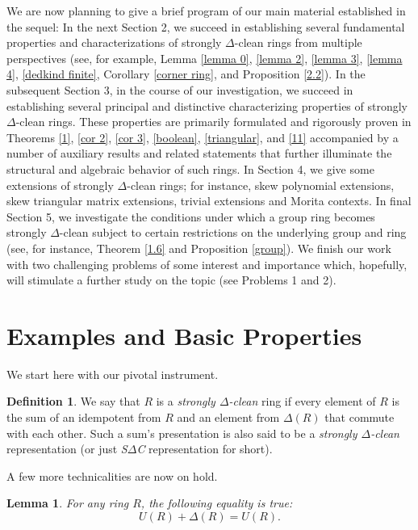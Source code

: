 \documentclass[12pt]{amsart}
\newtheorem{lemma}[theorem]{Lemma}
\theoremstyle{definition}
\newtheorem{definition}[theorem]{Definition}
\begin{document}
We are now planning to give a brief program of our main material established in the sequel: In the next Section 2, we succeed in establishing several fundamental properties and characterizations of strongly $\Delta$-clean rings from multiple perspectives (see, for example, Lemma \ref{lemma 0}, \ref{lemma 2}, \ref{lemma 3}, \ref{lemma 4}, \ref{dedkind finite}, Corollary \ref{corner ring}, and Proposition \ref{2.2}). In the subsequent Section 3, in the course of our investigation, we succeed in establishing several principal and distinctive characterizing properties of strongly $\Delta$-clean rings. These properties are primarily formulated and rigorously proven in Theorems \ref{1}, \ref{cor 2}, \ref{cor 3}, \ref{boolean}, \ref{triangular}, and \ref{11} accompanied by a number of auxiliary results and related statements that further illuminate the structural and algebraic behavior of such rings. In Section 4, we give some extensions of strongly $\Delta$-clean rings; for instance, skew polynomial extensions, skew triangular matrix extensions, trivial extensions and Morita contexts. In final Section 5, we investigate the conditions under which a group ring becomes strongly $\Delta$-clean subject to certain restrictions on the underlying group and ring (see, for instance, Theorem \ref{1.6} and Proposition \ref{group}). We finish our work with two challenging problems of some interest and importance which, hopefully, will stimulate a further study on the topic (see Problems 1 and 2).

\section{Examples and Basic Properties}

We start here with our pivotal instrument.

\begin{definition}
We say that $R$ is a {\it strongly $\Delta$-clean} ring if every element of $R$ is the sum of an idempotent from $R$ and an element from $\Delta(R)$ that commute with each other. Such a sum's presentation is also said to be a {\it strongly $\Delta$-clean} representation (or just {\it S$\Delta$C} representation for short).
\end{definition}

A few more technicalities are now on hold.

\begin{lemma}\label{1.1}
For any ring \(R\), the following equality is true:
	\[
	U(R) + \Delta(R) = U(R).
	\]
\end{lemma}
\end{document}
